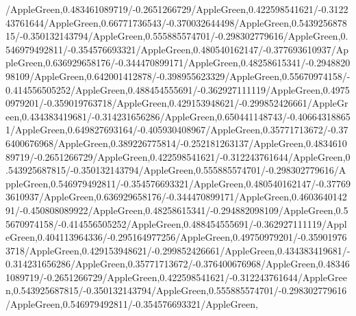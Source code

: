 {\begin{tikzternal}
{/AppleGreen,0.483461089719/-0.2651266729/AppleGreen,0.422598541621/-0.312243761644/AppleGreen,0.66771736543/-0.370032644498/AppleGreen,0.543925687815/-0.350132143794/AppleGreen,0.555885574701/-0.298302779616/AppleGreen,0.546979492811/-0.354576693321/AppleGreen,0.480540162147/-0.377693610937/AppleGreen,0.636929658176/-0.344470899171/AppleGreen,0.48258615341/-0.294882098109/AppleGreen,0.642001412878/-0.398955623329/AppleGreen,0.55670974158/-0.414556505252/AppleGreen,0.488454555691/-0.362927111119/AppleGreen,0.49750979201/-0.359019763718/AppleGreen,0.429153948621/-0.299852426661/AppleGreen,0.434383419681/-0.314231656286/AppleGreen,0.650441148743/-0.406643188651/AppleGreen,0.649827693164/-0.405930408967/AppleGreen,0.35771713672/-0.376400676968/AppleGreen,0.389226775814/-0.252181263137/AppleGreen,0.483461089719/-0.2651266729/AppleGreen,0.422598541621/-0.312243761644/AppleGreen,0.543925687815/-0.350132143794/AppleGreen,0.555885574701/-0.298302779616/AppleGreen,0.546979492811/-0.354576693321/AppleGreen,0.480540162147/-0.377693610937/AppleGreen,0.636929658176/-0.344470899171/AppleGreen,0.460364014291/-0.450808089922/AppleGreen,0.48258615341/-0.294882098109/AppleGreen,0.55670974158/-0.414556505252/AppleGreen,0.488454555691/-0.362927111119/AppleGreen,0.404113964336/-0.295164977256/AppleGreen,0.49750979201/-0.359019763718/AppleGreen,0.429153948621/-0.299852426661/AppleGreen,0.434383419681/-0.314231656286/AppleGreen,0.35771713672/-0.376400676968/AppleGreen,0.483461089719/-0.2651266729/AppleGreen,0.422598541621/-0.312243761644/AppleGreen,0.543925687815/-0.350132143794/AppleGreen,0.555885574701/-0.298302779616/AppleGreen,0.546979492811/-0.354576693321/AppleGreen,
}
\end{tikzternal}}
